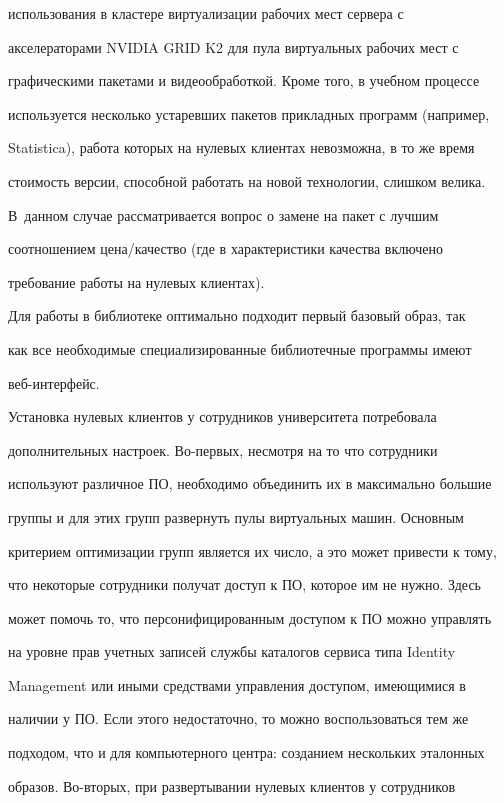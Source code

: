 использования в кластере виртуализации рабочих мест сервера с 

акселераторами NVIDIA GRID K2 для пула виртуальных рабочих мест с 

графическими пакетами и видеообработкой. Кроме того, в учебном процессе 

используется несколько устаревших пакетов прикладных программ (например, 

Statistica), работа которых на нулевых клиентах невозможна, в то же время 

стоимость версии, способной работать на новой технологии, слишком велика. 

В~данном случае рассматривается вопрос о замене на пакет с лучшим 

соотношением цена/качество (где в характеристики качества включено 

требование работы на нулевых клиентах). 

  

  Для работы в библиотеке оптимально подходит первый базовый образ, так 

как все необходимые специализированные библиотечные программы имеют 

веб-ин\-тер\-фейс. 

  

  Установка нулевых клиентов у сотрудников университета потребовала 

дополнительных настроек. Во-пер\-вых, несмотря на то что сотрудники 

используют различное ПО, необходимо объединить их в максимально большие 

группы и для этих групп развернуть пулы виртуальных машин. Основным 

критерием оптимизации групп является их число, а это может привести к тому, 

что некоторые сотрудники получат доступ к ПО, которое им не нужно. Здесь 

может помочь то, что персонифицированным доступом к ПО можно управлять 

на уровне прав учетных записей службы каталогов сервиса типа Identity 

Management или иными средствами управления доступом, имеющимися в 

наличии у ПО. Если этого недостаточно, то можно воспользоваться тем же 

подходом, что и для компьютерного центра: созданием нескольких эталонных 

образов. Во-вто\-рых, при развертывании нулевых клиентов у сотрудников 

